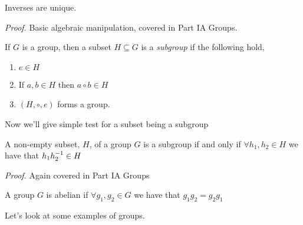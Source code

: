 \documentclass{article}
\begin{document}
\begin{proposition}
  Inverses are unique.
\end{proposition}
\textit{Proof.} Basic algebraic manipulation, covered in Part IA Groups.
\begin{definition}
	If $ G $ is a group, then a subset $ H\subseteq G $ is a \textit{subgroup} if the following hold,
\begin{enumerate}
	\item $ e\in H $
	\item If $ a,b\in H $ then $ a\circ b\in H $
\item $ (H,\circ, e) $ forms a group.
\end{enumerate}
\end{definition}
Now we'll give simple test for a subset being a subgroup
\begin{lemma}
  A non-empty subset, $ H $, of a group $ G $ is a subgroup if and only if $ \forall h_1,h_2\in H $ we have that $ h_1 {h}^{-1}_2\in H $
\end{lemma}
\textit{Proof.} Again covered in Part IA Groups
\begin{definition}
  A group $ G $ is abelian if $ \forall g_1,g_2\in G $ we have that $ g_1g_2=g_2g_1 $
\end{definition}
Let's look at some examples of groups.
\end{document}
